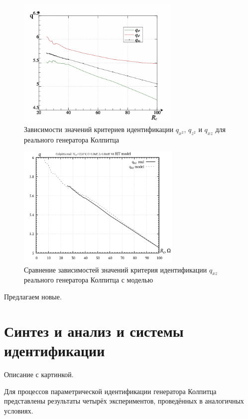 \begin{figure}[htb!]
\centerline{\includegraphics[width=0.7\textwidth]{p/colp_read_q-p_Rc_q.png} }
  \caption{Зависимости значений критериев идентификации $q_{x^2}$, $q_{z^2}$ и $q_{xz}$ для реального генератора Колпитца}
\label{atu:colp_read_q-p_Rc_q-p_Rc_q}
\end{figure}

\begin{figure}[htb!]
\centerline{\includegraphics[width=0.7\textwidth]{p/colp_q_cml.png} }
\caption{Сравнение зависимостей значений критерия идентификации $q_{xz}$ реального генератора Колпитца с моделью}
\label{atu:colp_q_cml}
\end{figure}

Предлагаем новые.

\section{Синтез и анализ и системы идентификации}

Описание с картинкой.

Для процессов параметрической идентификации генератора Колпитца представлены результаты четырёх экспериментов,
проведённых в аналогичных условиях.

